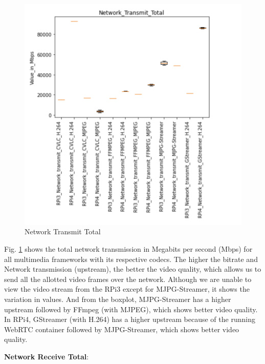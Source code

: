 \begin{figure}[H]
   \centering
   \includegraphics[width=.8\textwidth]{images/Boxplots/Network_Transmit_Total.png}
   \caption{Network Transmit Total}
   \label{fig:network_transmit_total}
\end{figure}

Fig. \ref{fig:network_transmit_total} shows the total network transmission in Megabits per second (Mbps) for all multimedia frameworks with its respective codecs. The higher the bitrate and Network transmission (upstream), the better the video quality, which allows us to send all the allotted video frames over the network. Although we are unable to view the video stream from the RPi3 except for MJPG-Streamer, it shows the variation in values. And from the boxplot, MJPG-Streamer has a higher upstream followed by FFmpeg (with MJPEG), which shows better video quality. In RPi4, GStreamer (with H.264) has a higher upstream because of the running WebRTC container followed by MJPG-Streamer, which shows better video quality.

\newpage
\textbf{Network Receive Total}:

